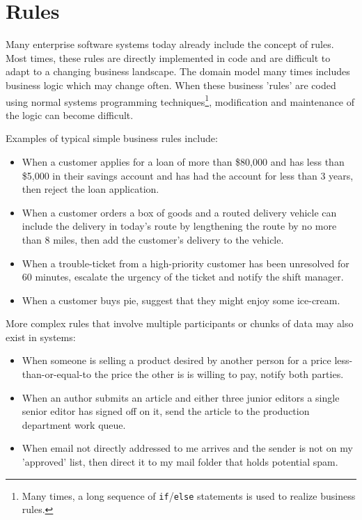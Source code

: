 \section{Rules}

Many enterprise software systems today already include the concept of
rules.  Most times, these rules are directly implemented in code and
are difficult to adapt to a changing business landscape.  The domain
model many times includes business logic which may change often. When
these business 'rules' are coded using normal systems programming
techniques\footnote{Many times, a long sequence of
\texttt{if}/\texttt{else} statements is used to realize business
rules.}, modification and maintenance of the logic can become
difficult.

Examples of typical simple business rules include:

\begin{itemize}

	\item When a customer applies for a loan of more than \$80,000 
		and has less than \$5,000 in their savings account and
		has had the account for less than 3 years, then reject
		the loan application.

	\item When a customer orders a box of goods and a routed delivery 
		vehicle can include the delivery in today's route by
		lengthening the route by no more than 8 miles, then add
		the customer's delivery to the vehicle.

	\item When a trouble-ticket from a high-priority customer has
		been unresolved for 60 minutes, escalate the urgency of the
		ticket and notify the shift manager.

	\item When a customer buys pie, suggest that they might enjoy
		some ice-cream.
		
\end{itemize}

More complex rules that involve multiple participants or chunks of data
may also exist in systems:

\begin{itemize}

	\item When someone is selling a product desired by another person
		for a price less-than-or-equal-to the price the other is
		is willing to pay, notify both parties.

	\item When an author submits an article and either three junior
		editors a single senior editor has signed off on it, send
		the article to the production department work queue.

	\item When email not directly addressed to me arrives and the
		sender is not on my 'approved' list, then direct it to
		my mail folder that holds potential spam.

\end{itemize}

